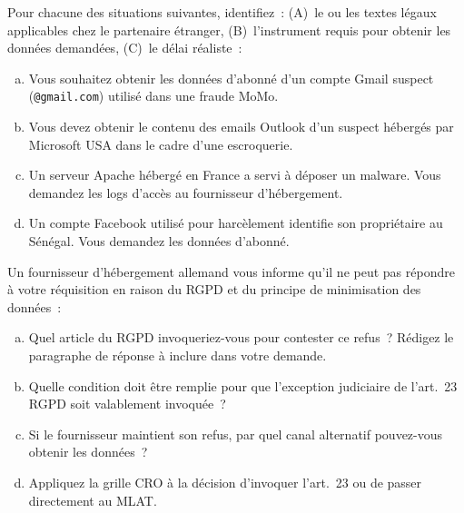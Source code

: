 \begin{boxexo}[title={\ding{45}\quad Exercice~11.1 --- Identification du cadre légal \niveaubase}]
Pour chacune des situations suivantes, identifiez~: (A)~le ou les textes
légaux applicables chez le partenaire étranger, (B)~l'instrument requis
pour obtenir les données demandées, (C)~le délai réaliste~:
\begin{enumerate}[(a)]
    \item Vous souhaitez obtenir les données d'abonné d'un compte Gmail
          suspect (\texttt{@gmail.com}) utilisé dans une fraude MoMo.
    \item Vous devez obtenir le contenu des emails Outlook d'un suspect
          hébergés par Microsoft USA dans le cadre d'une escroquerie.
    \item Un serveur Apache hébergé en France a servi à déposer un malware.
          Vous demandez les logs d'accès au fournisseur d'hébergement.
    \item Un compte Facebook utilisé pour harcèlement identifie son
          propriétaire au Sénégal. Vous demandez les données d'abonné.
\end{enumerate}
\end{boxexo}

\begin{boxexo}[title={\ding{45}\quad Exercice~11.2 --- Tensions RGPD \niveaumoyen}]
Un fournisseur d'hébergement allemand vous informe qu'il ne peut pas
répondre à votre réquisition en raison du RGPD et du principe de
minimisation des données~:
\begin{enumerate}[(a)]
    \item Quel article du RGPD invoqueriez-vous pour contester ce refus~?
          Rédigez le paragraphe de réponse à inclure dans votre demande.
    \item Quelle condition doit être remplie pour que l'exception judiciaire
          de l'art.~23 RGPD soit valablement invoquée~?
    \item Si le fournisseur maintient son refus, par quel canal alternatif
          pouvez-vous obtenir les données~?
    \item Appliquez la grille CRO à la décision d'invoquer l'art.~23
          ou de passer directement au MLAT.
\end{enumerate}
\end{boxexo}

